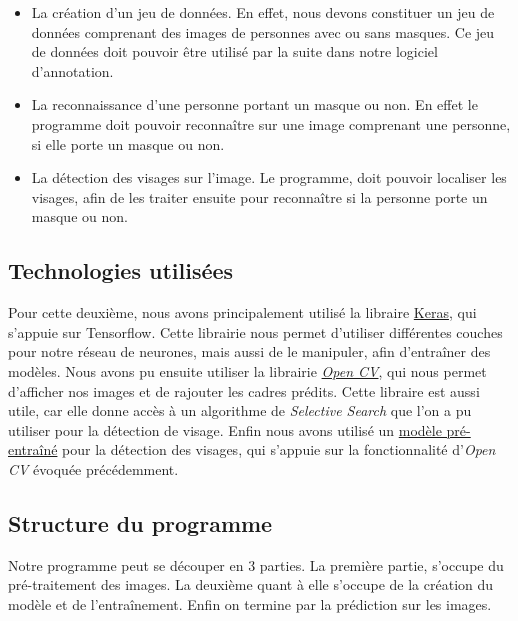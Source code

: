 \documentclass{rapport}
\begin{document}
            \begin{itemize}
                \item La création d'un jeu de données. En effet, nous devons constituer un jeu de données comprenant des images de personnes avec ou sans masques. Ce jeu de données doit pouvoir être utilisé par la suite dans notre logiciel d'annotation.
                
                \item La reconnaissance d'une personne portant un masque ou non. En effet le programme doit pouvoir reconnaître sur une image comprenant une personne, si elle porte un masque ou non.
                
                \item La détection des visages sur l'image. Le programme, doit pouvoir localiser les visages, afin de les traiter ensuite pour reconnaître si la personne porte un masque ou non.
                
            \end{itemize}
        \subsection{Technologies utilisées}
        
            Pour cette deuxième, nous avons principalement utilisé la libraire \href{https://keras.io/}{Keras}, qui s'appuie sur Tensorflow\cite{KerasInstall}. Cette librairie nous permet d'utiliser différentes couches pour notre réseau de neurones, mais aussi de le manipuler, afin d'entraîner des modèles. Nous avons pu ensuite utiliser la librairie \href{https://opencv.org/}{\textit{Open CV}}, qui nous permet d'afficher nos images et de rajouter les cadres prédits. Cette libraire est aussi utile, car elle donne accès à un algorithme de \textit{\textit{Selective Search}} que l'on a pu utiliser pour la détection de visage. Enfin nous avons utilisé un \href{https://github.com/anasbadawy/Face-Detection}{modèle pré-entraîné} pour la détection des visages, qui s'appuie sur la fonctionnalité d'\textit{Open CV} évoquée précédemment.
            
        \subsection{Structure du programme}
        
            Notre programme peut se découper en 3 parties. La première partie, s'occupe du pré-traitement des images. La deuxième quant à elle s'occupe de la création du modèle et de l'entraînement. Enfin on termine par la prédiction sur les images.
            
\end{document}

